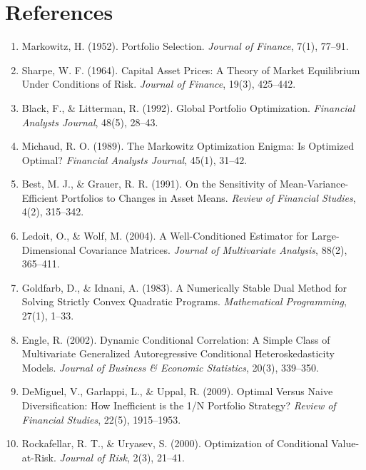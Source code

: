 \documentclass[12pt]{article}
\begin{document}
\section*{References}

\begin{enumerate}
  \item Markowitz, H. (1952). Portfolio Selection. \textit{Journal of Finance},
        7(1), 77--91.
  \item Sharpe, W. F. (1964). Capital Asset Prices: A Theory of Market
        Equilibrium Under Conditions of Risk. \textit{Journal of Finance},
        19(3), 425--442.
  \item Black, F., \& Litterman, R. (1992). Global Portfolio Optimization.
        \textit{Financial Analysts Journal}, 48(5), 28--43.
  \item Michaud, R. O. (1989). The Markowitz Optimization Enigma: Is
        Optimized Optimal? \textit{Financial Analysts Journal}, 45(1), 31--42.
  \item Best, M. J., \& Grauer, R. R. (1991). On the Sensitivity of
        Mean-Variance-Efficient Portfolios to Changes in Asset Means.
        \textit{Review of Financial Studies}, 4(2), 315--342.
  \item Ledoit, O., \& Wolf, M. (2004). A Well-Conditioned Estimator for
        Large-Dimensional Covariance Matrices. \textit{Journal of Multivariate
        Analysis}, 88(2), 365--411.
  \item Goldfarb, D., \& Idnani, A. (1983). A Numerically Stable Dual Method
        for Solving Strictly Convex Quadratic Programs. \textit{Mathematical
        Programming}, 27(1), 1--33.
  \item Engle, R. (2002). Dynamic Conditional Correlation: A Simple Class of
        Multivariate Generalized Autoregressive Conditional Heteroskedasticity
        Models. \textit{Journal of Business \& Economic Statistics}, 20(3),
        339--350.
  \item DeMiguel, V., Garlappi, L., \& Uppal, R. (2009). Optimal Versus
        Naive Diversification: How Inefficient is the 1/N Portfolio Strategy?
        \textit{Review of Financial Studies}, 22(5), 1915--1953.
  \item Rockafellar, R. T., \& Uryasev, S. (2000). Optimization of
        Conditional Value-at-Risk. \textit{Journal of Risk}, 2(3), 21--41.
\end{enumerate}
\end{document}
